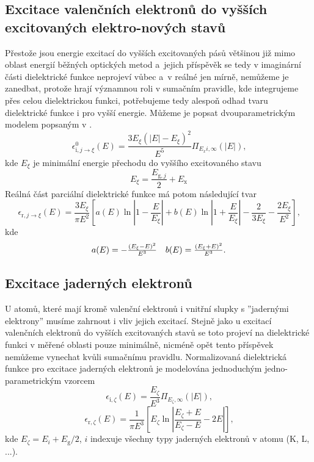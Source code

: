 \subsection{Excitace valenčních elektronů do vyšších excitovaných elektro-nových stavů}
Přestože jsou energie excitací do vyšších excitovaných pásů většinou již mimo oblast energií běžných optických metod a~jejich příspěvěk se tedy v imaginární části dielektrické funkce neprojeví vůbec a~v reálné jen mírně, nemůžeme je zanedbat, protože hrají významnou roli v sumačním pravidle, kde integrujeme přes celou dielektrickou funkci, potřebujeme tedy alespoň odhad tvaru dielektrické funkce i pro vyšší energie. 
Můžeme je popsat dvouparametrickým modelem popsaným v \cite{sumrule}.
\begin{equation}
\label{vyssiexcitace}
\epsilon_{\mathrm{i}, j \rightarrow \xi}^0(E) = \frac{3 E_\xi(|E| - E_\xi)^2}{E^5} \Pi_{E_xi, \infty}(|E|) \text{,}
\end{equation}
kde $E_\xi$ je minimální energie přechodu do vyššího excitovaného stavu
\begin{equation}
E_\xi = \frac{E_{\mathrm{g},j}}{2} + E_\mathrm{x}
\end{equation}
Reálná část parciální dielektrické funkce má potom následující tvar
\begin{equation}
\epsilon_{\mathrm{r}, j \rightarrow \xi}(E) = 
\frac{3E_\xi}{\pi E^2}
\left[
	a(E) \ln\left|1-\frac{E}{E_\xi}\right|
	+ b(E) \ln\left|1 + \frac{E}{E_\xi}\right|
	- \frac{2}{3E_\xi} - \frac{2E_\xi}{E^2}
\right] \text{,}
\end{equation}
kde
\begin{equation}
\begin{array}{c c}
a(E) = -\frac{(E_\xi - E)^2}{E^3} &
b(E) = \frac{(E_\xi + E)^2}{E^3} \text{.}\\
\end{array}
\end{equation}


\subsection{Excitace jaderných elektronů}
U atomů, které mají kromě valenční elektronů i vnitřní slupky s ''jadernými elektrony'' musíme zahrnout i vliv jejich excitací. Stejně jako u excitací valenčních elektronů do vyšších excitovaných stavů se toto projeví na dielektrické funkci v měřené oblasti pouze minimálně, nicméně opět tento příspěvek nemůžeme vynechat kvůli sumačnímu pravidlu. Normalizovaná dielektrická funkce pro excitace jaderných elektronů je modelována jednoduchým jedno-parametrickým vzorcem \cite{sumrule2}
\begin{equation}
\label{jaderneel}
\epsilon_{\mathrm{i},\zeta}(E) = \frac{E_\zeta}{E^3} \Pi_{E_\zeta,\infty}(|E|) \text{,}
\end{equation}
\begin{equation}
\epsilon_{\mathrm{r},\zeta}(E) = \frac{1}{\pi E^3}\left[ E_\zeta \ln\left| \frac{E_\zeta + E}{E_\zeta - E} - 2E\right| \right] \text{,}
\end{equation}
kde $E_\zeta = E_i + E_\mathrm{g}/2$, $i$ indexuje všechny typy jaderných elektronů v atomu (K, L, ...). 

